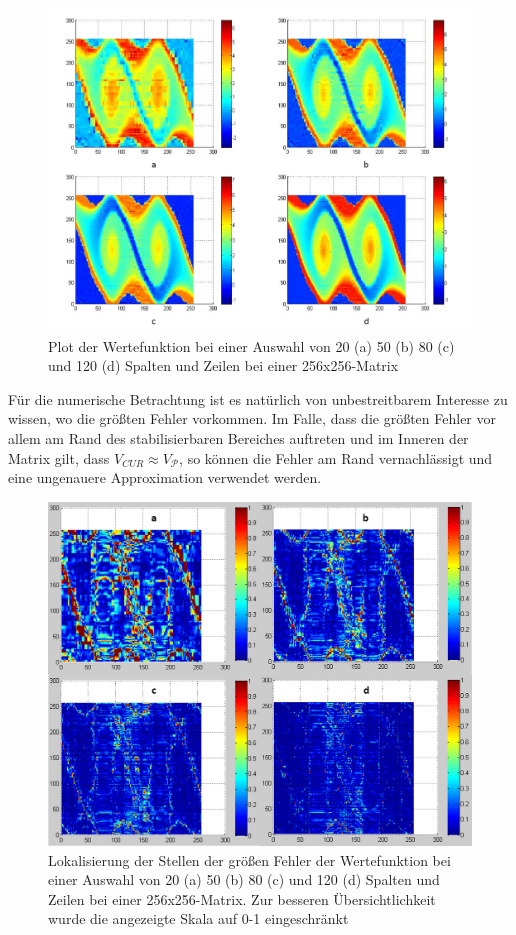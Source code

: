 \documentclass[12pt,a4paper,twoside]{article}
\begin{document}
	\begin{figure}[h]
		\center
		\includegraphics[scale=0.3]{CUR_valuefunctions}
		\caption{Plot der Wertefunktion bei einer Auswahl von 20 (a) 50 (b) 80 (c) und 120 (d) Spalten und Zeilen bei einer 256x256-Matrix}
	\end{figure}
	\newpage
	Für die numerische Betrachtung ist es natürlich von unbestreitbarem Interesse zu wissen, wo die größten 
	Fehler vorkommen. Im Falle, dass die größten Fehler vor allem am Rand des stabilisierbaren Bereiches auftreten 
	und im Inneren der Matrix gilt, dass $V_{CUR}\approx V_\mathcal{P}$, so können die Fehler am Rand 
	vernachlässigt und eine ungenauere Approximation verwendet werden. 
	\begin{figure}[h]
		\center
		\includegraphics[scale=0.3]{CUR_fehlerstellen}
		\caption{Lokalisierung der Stellen der größen Fehler der Wertefunktion bei einer Auswahl von 20 (a) 50 (b) 80 (c) und 120 (d) Spalten und Zeilen bei einer 256x256-Matrix. Zur besseren Übersichtlichkeit wurde die angezeigte Skala auf 0-1 eingeschränkt}
	\end{figure}
\end{document}
